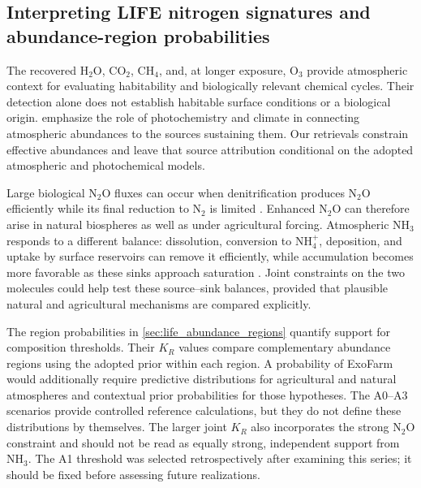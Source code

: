 \subsection{Interpreting LIFE nitrogen signatures and abundance-region probabilities}
\label{sec:life_interpretation}

The recovered $\mathrm{H_2O}$, $\mathrm{CO_2}$, $\mathrm{CH_4}$, and, at longer exposure, $\mathrm{O_3}$ provide atmospheric context for evaluating habitability and biologically relevant chemical cycles. Their detection alone does not establish habitable surface conditions or a biological origin. \citet{woganSurfaceFluxes2026} emphasize the role of photochemistry and climate in connecting atmospheric abundances to the sources sustaining them. Our retrievals constrain effective abundances and leave that source attribution conditional on the adopted atmospheric and photochemical models.

Large biological $\mathrm{N_2O}$ fluxes can occur when denitrification produces $\mathrm{N_2O}$ efficiently while its final reduction to $\mathrm{N_2}$ is limited \citep{schwietermanEvaluatingPlausibleRange2022}. Enhanced $\mathrm{N_2O}$ can therefore arise in natural biospheres as well as under agricultural forcing. Atmospheric $\mathrm{NH_3}$ responds to a different balance: dissolution, conversion to $\mathrm{NH_4^+}$, deposition, and uptake by surface reservoirs can remove it efficiently, while accumulation becomes more favorable as these sinks approach saturation \citep{huangAssessmentAmmoniaBiosignature2022a}. Joint constraints on the two molecules could help test these source--sink balances, provided that plausible natural and agricultural mechanisms are compared explicitly.

The region probabilities in \autoref{sec:life_abundance_regions} quantify support for composition thresholds. Their $K_R$ values compare complementary abundance regions using the adopted prior within each region. A probability of ExoFarm would additionally require predictive distributions for agricultural and natural atmospheres and contextual prior probabilities for those hypotheses. The A0--A3 scenarios provide controlled reference calculations, but they do not define these distributions by themselves. The larger joint $K_R$ also incorporates the strong $\mathrm{N_2O}$ constraint and should not be read as equally strong, independent support from $\mathrm{NH_3}$. The A1 threshold was selected retrospectively after examining this series; it should be fixed before assessing future realizations.

